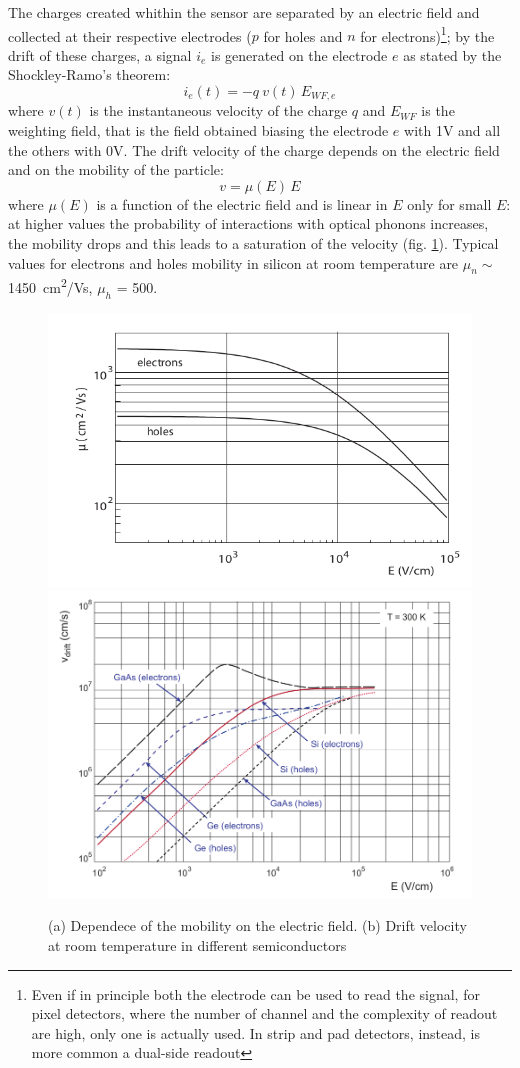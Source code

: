    The charges created whithin the sensor are separated by an electric field and collected at their respective electrodes ($p$ for holes and $n$ for electrons)\footnote{Even if in principle both the electrode can be used to read the signal, for pixel detectors, where the number of channel and the complexity of readout are high, only one is actually used. In strip and pad detectors, instead, is more common a dual-side readout}; by the drift of these charges, a signal $i_e$ is generated on the  electrode $e$ as stated by the Shockley-Ramo's theorem: 
    \begin{equation}
        i_e(t) = -q\: v(t)\, E_{WF,e}
    \end{equation}
    where $v(t)$ is the instantaneous velocity of the charge $q$ and $E_{WF}$ is the weighting field, that is the field obtained biasing the electrode $e$ with 1V and all the others with 0V. The drift velocity of the charge depends on the electric field and on the mobility of the particle:
    \begin{equation}
        v = \mu(E)\, E
    \end{equation}
    where $\mu(E)$ is a function of the electric field and is linear in $E$ only for small $E$: at higher values the probability of interactions with optical phonons increases, the mobility drops and this leads to a saturation of the velocity (fig. \ref{fig:mobility_drift}). Typical values for electrons and holes mobility 
    in silicon at room temperature are $\mu _n \sim$\SI{1450}{cm\squared/Vs}, $\mu _h$ = 500.
   
    \begin{figure}[h!]
        \centering
        \includegraphics[width=.49\linewidth]{figures/Pixel_detectors/mobility_in_semiconductor.png}
        \includegraphics[width=.45\linewidth]{figures/Pixel_detectors/velocity_in_semiconductor.png}
        \caption{(a) Dependece of the mobility on the electric field. (b) Drift velocity at room temperature in different semiconductors}
        \label{fig:mobility_drift}
    \end{figure}

